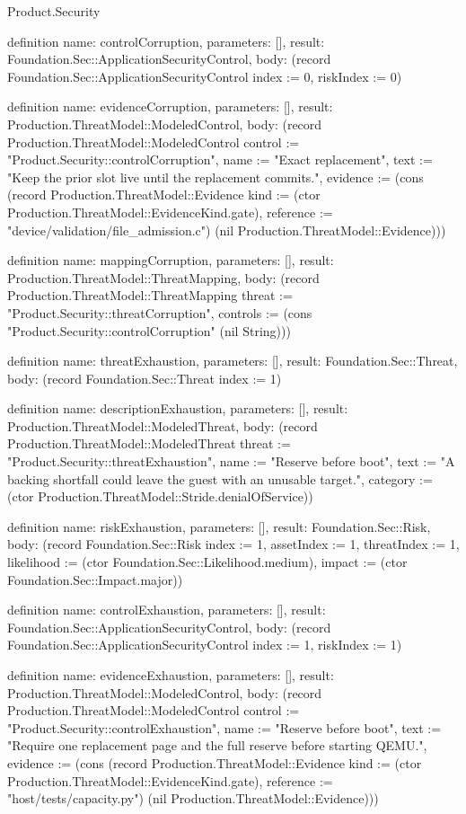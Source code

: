 \begin{lexlean}{Product.Security}
\begin{semanticmodule}
definition{
  name: controlCorruption, parameters: [], result: Foundation.Sec::ApplicationSecurityControl,
  body: (record Foundation.Sec::ApplicationSecurityControl {index := 0, riskIndex := 0})
}

definition{
  name: evidenceCorruption, parameters: [], result: Production.ThreatModel::ModeledControl,
  body: (record Production.ThreatModel::ModeledControl {control := "Product.Security::controlCorruption", name := "Exact replacement", text := "Keep the prior slot live until the replacement commits.", evidence := (cons (record Production.ThreatModel::Evidence {kind := (ctor Production.ThreatModel::EvidenceKind.gate), reference := "device/validation/file_admission.c"}) (nil Production.ThreatModel::Evidence))})
}

definition{
  name: mappingCorruption, parameters: [], result: Production.ThreatModel::ThreatMapping,
  body: (record Production.ThreatModel::ThreatMapping {threat := "Product.Security::threatCorruption", controls := (cons "Product.Security::controlCorruption" (nil String))})
}

definition{
  name: threatExhaustion, parameters: [], result: Foundation.Sec::Threat,
  body: (record Foundation.Sec::Threat {index := 1})
}

definition{
  name: descriptionExhaustion, parameters: [], result: Production.ThreatModel::ModeledThreat,
  body: (record Production.ThreatModel::ModeledThreat {threat := "Product.Security::threatExhaustion", name := "Reserve before boot", text := "A backing shortfall could leave the guest with an unusable target.", category := (ctor Production.ThreatModel::Stride.denialOfService)})
}

definition{
  name: riskExhaustion, parameters: [], result: Foundation.Sec::Risk,
  body: (record Foundation.Sec::Risk {index := 1, assetIndex := 1, threatIndex := 1, likelihood := (ctor Foundation.Sec::Likelihood.medium), impact := (ctor Foundation.Sec::Impact.major)})
}

definition{
  name: controlExhaustion, parameters: [], result: Foundation.Sec::ApplicationSecurityControl,
  body: (record Foundation.Sec::ApplicationSecurityControl {index := 1, riskIndex := 1})
}

definition{
  name: evidenceExhaustion, parameters: [], result: Production.ThreatModel::ModeledControl,
  body: (record Production.ThreatModel::ModeledControl {control := "Product.Security::controlExhaustion", name := "Reserve before boot", text := "Require one replacement page and the full reserve before starting QEMU.", evidence := (cons (record Production.ThreatModel::Evidence {kind := (ctor Production.ThreatModel::EvidenceKind.gate), reference := "host/tests/capacity.py"}) (nil Production.ThreatModel::Evidence))})
}


\end{semanticmodule}
\end{lexlean}
